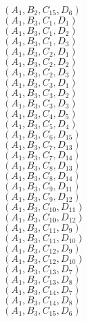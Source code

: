 \documentclass[14pt]{article}
\begin{document}
    $({A}_{1}, {B}_{2}, {C}_{15}, {D}_{6}) $ \\ 
    $({A}_{1}, {B}_{3}, {C}_{1}, {D}_{1}) $ \\ 
    $({A}_{1}, {B}_{3}, {C}_{1}, {D}_{2}) $ \\ 
    $({A}_{1}, {B}_{3}, {C}_{1}, {D}_{3}) $ \\ 
    $({A}_{1}, {B}_{3}, {C}_{2}, {D}_{1}) $ \\ 
    $({A}_{1}, {B}_{3}, {C}_{2}, {D}_{2}) $ \\ 
    $({A}_{1}, {B}_{3}, {C}_{2}, {D}_{3}) $ \\ 
    $({A}_{1}, {B}_{3}, {C}_{3}, {D}_{1}) $ \\ 
    $({A}_{1}, {B}_{3}, {C}_{3}, {D}_{2}) $ \\ 
    $({A}_{1}, {B}_{3}, {C}_{3}, {D}_{3}) $ \\ 
    $({A}_{1}, {B}_{3}, {C}_{4}, {D}_{5}) $ \\ 
    $({A}_{1}, {B}_{3}, {C}_{5}, {D}_{4}) $ \\ 
    $({A}_{1}, {B}_{3}, {C}_{6}, {D}_{15}) $ \\ 
    $({A}_{1}, {B}_{3}, {C}_{7}, {D}_{13}) $ \\ 
    $({A}_{1}, {B}_{3}, {C}_{7}, {D}_{14}) $ \\ 
    $({A}_{1}, {B}_{3}, {C}_{8}, {D}_{13}) $ \\ 
    $({A}_{1}, {B}_{3}, {C}_{8}, {D}_{14}) $ \\ 
    $({A}_{1}, {B}_{3}, {C}_{9}, {D}_{11}) $ \\ 
    $({A}_{1}, {B}_{3}, {C}_{9}, {D}_{12}) $ \\ 
    $({A}_{1}, {B}_{3}, {C}_{10}, {D}_{11}) $ \\ 
    $({A}_{1}, {B}_{3}, {C}_{10}, {D}_{12}) $ \\ 
    $({A}_{1}, {B}_{3}, {C}_{11}, {D}_{9}) $ \\ 
    $({A}_{1}, {B}_{3}, {C}_{11}, {D}_{10}) $ \\ 
    $({A}_{1}, {B}_{3}, {C}_{12}, {D}_{9}) $ \\ 
    $({A}_{1}, {B}_{3}, {C}_{12}, {D}_{10}) $ \\ 
    $({A}_{1}, {B}_{3}, {C}_{13}, {D}_{7}) $ \\ 
    $({A}_{1}, {B}_{3}, {C}_{13}, {D}_{8}) $ \\ 
    $({A}_{1}, {B}_{3}, {C}_{14}, {D}_{7}) $ \\ 
    $({A}_{1}, {B}_{3}, {C}_{14}, {D}_{8}) $ \\ 
    $({A}_{1}, {B}_{3}, {C}_{15}, {D}_{6}) $ \\ 
\end{document}
